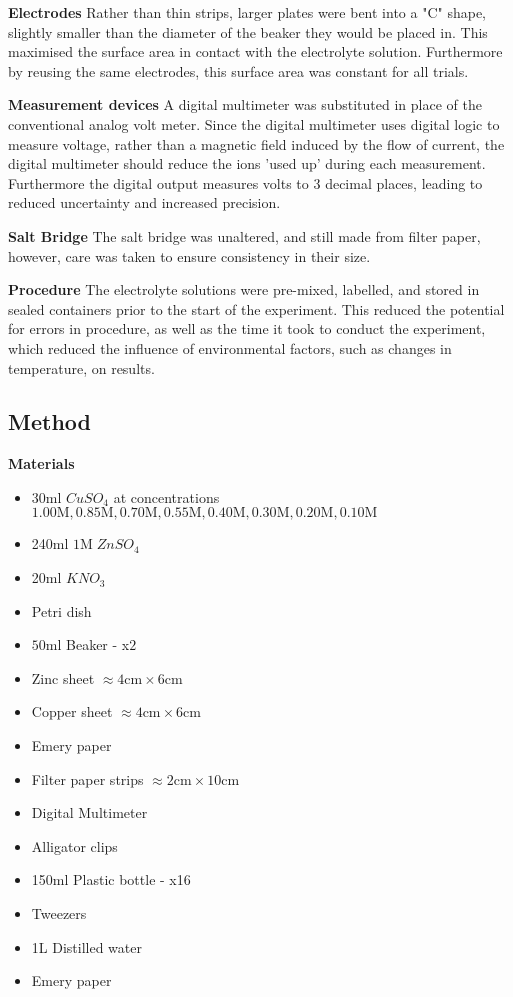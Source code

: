 \documentclass[11pt,a4paper]{article}
\begin{document}
\textbf{Electrodes}\newline
Rather than thin strips, larger plates were bent into a "C" shape, slightly smaller than the diameter of the beaker they would be placed in. This maximised the surface area in contact with the electrolyte solution. Furthermore by reusing the same electrodes, this surface area was constant for all trials.

\textbf{Measurement devices}\newline
A digital multimeter was substituted in place of the conventional analog volt meter. Since the digital multimeter uses digital logic to measure voltage, rather than a magnetic field induced by the flow of current, the digital multimeter should reduce the ions 'used up' during each measurement. Furthermore the digital output measures volts to 3 decimal places, leading to reduced uncertainty and increased precision. 

\textbf{Salt Bridge}\newline
The salt bridge was unaltered, and still made from filter paper, however, care was taken to ensure consistency in their size.

\textbf{Procedure}\newline
The electrolyte solutions were pre-mixed, labelled, and stored in sealed containers prior to the start of the experiment. This reduced the potential for errors in procedure, as well as the time it took to conduct the experiment, which reduced the influence of environmental factors, such as changes in temperature, on results.

\subsection{Method}
\textbf{Materials}
\begin{itemize}
	\item 30ml $CuSO_4$ at concentrations $1.00\textrm{M}, 0.85\textrm{M}, 0.70\textrm{M}, 0.55\textrm{M}, 0.40\textrm{M}, 0.30\textrm{M}, 0.20\textrm{M}, 0.10\textrm{M}$
	\item 240ml $1$M$\;ZnSO_4$
	\item 20ml $KNO_3$
	\item Petri dish
	\item $50\textrm{ml}$ Beaker - x$2$
	\item Zinc sheet $\approx4\textrm{cm}\times6\textrm{cm}$ 
	\item Copper sheet $\approx4\textrm{cm}\times6\textrm{cm}$ 
	\item Emery paper
	\item Filter paper strips $\approx 2\textrm{cm}\times10\textrm{cm}$
	\item Digital Multimeter
	\item Alligator clips
	\item 150ml Plastic bottle - x16
	\item Tweezers 
	\item 1L Distilled water
	\item Emery paper
\end{itemize}
\end{document}
